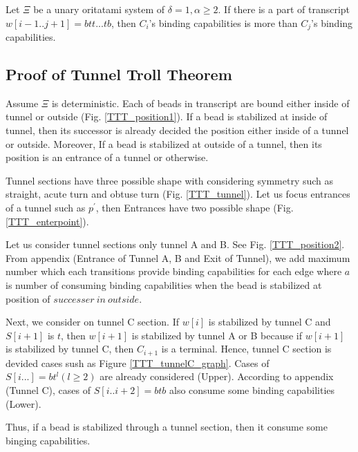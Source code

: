 \documentclass[runningheads]{llncs}
\begin{document}
\begin{theorem}
  Let $\Xi$ be a unary oritatami system of $\delta = 1, \alpha \geq 2$. If there is a part of transcript $w[i-1..j+1] = btt...tb$, then $C_i$'s binding capabilities is more than $C_j$'s binding capabilities.
\end{theorem}

\subsection{Proof of Tunnel Troll Theorem}
Assume $\Xi$ is deterministic. %
Each of beads in transcript are bound either inside of tunnel or outside (Fig. \ref{TTT_position1}). If a bead is stabilized at inside of tunnel, then its successor is already decided the position either inside of a tunnel or outside. Moreover, If a bead is stabilized at outside of a tunnel, then its position is an entrance of a tunnel or otherwise.


Tunnel sections have three possible shape with considering symmetry such as straight, acute turn and obtuse turn (Fig. \ref{TTT_tunnel}). Let us focus entrances of a tunnel such as $p^\prime$, then Entrances have two possible shape (Fig. \ref{TTT_enterpoint}).


Let us consider tunnel sections only tunnel A and B. See Fig. \ref{TTT_position2}. From appendix (Entrance of Tunnel A, B and Exit of Tunnel), we add maximum number which each transitions provide binding capabilities for each edge where $a$ is number of consuming binding capabilities when the bead is stabilized at position of $successer\ in\ outside$.


Next, we consider on tunnel C section. If $w[i]$ is stabilized by tunnel C and $S[i+1]$ is $t$, then $w[i+1]$ is stabilized by tunnel A or B because if $w[i+1]$ is stabilized by tunnel C, then $C_{i+1}$ is a terminal. Hence, tunnel C section is devided cases sush as Figure \ref{TTT_tunnelC_graph}. Cases of $S[i...] = bt^l (l \geq 2)$ are already considered (Upper). According to appendix (Tunnel C), cases of $S[i..i+2] = btb$ also consume some binding capabilities (Lower).


Thus, if a bead is stabilized through a tunnel section, then it consume some binging capabilities.
\end{document}
